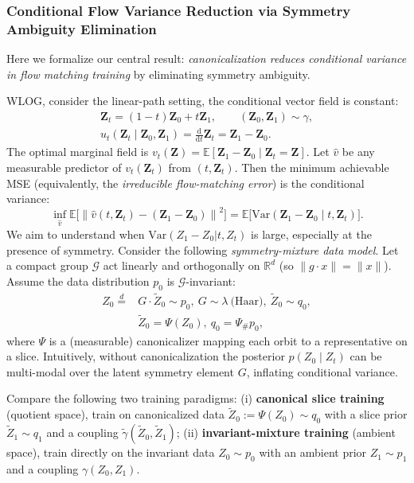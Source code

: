 \documentclass{article}
\theoremstyle{plain}
\theoremstyle{definition}
\theoremstyle{remark}
\newcommand{\E}{\mathbb{E}}
\newcommand{\1}{\mathbf{1}}
\newcommand{\Z}{\mathbf{Z}}
\newcommand{\norm}[1]{\left\lVert #1\right\rVert}
\begin{document}
\subsubsection{Conditional Flow Variance Reduction via Symmetry Ambiguity Elimination}\label{subsubsec:variance}
Here we formalize our central result: \emph{canonicalization reduces conditional variance in flow matching training} by eliminating symmetry ambiguity.

WLOG, consider the linear-path setting, the conditional vector field is constant:
\begin{equation}
\begin{aligned}
\Z_t = (1-t)\Z_0 + t\Z_1,\qquad (\Z_0,\Z_1)\sim \gamma,\\
u_t(\Z_t\mid \Z_0,\Z_1)=\frac{\mathrm{d}}{\mathrm{d}t}\Z_t = \Z_1-\Z_0.
\end{aligned}
\end{equation}
The optimal marginal field is $v_t(\Z)=\E[\Z_1-\Z_0\mid \Z_t=\Z]$.
Let $\hat v$ be any measurable predictor of $v_t(\Z_t)$ from $(t,\Z_t)$. Then the minimum achievable MSE (equivalently, the \emph{irreducible flow-matching error}) is the conditional variance:
\begin{equation*}
\inf_{\hat v}\E\big[\norm{\hat v(t,\Z_t)-(\Z_1-\Z_0)}^2\big]
=\E\big[\mathrm{Var}(\Z_1-\Z_0\mid t,\Z_t)\big].
\end{equation*}
We aim to understand when $\mathrm{Var}(Z_1-Z_0|t,Z_t)$ is large, especially at the presence of symmetry.
Consider the following \emph{symmetry-mixture data model}.
Let a compact group $\mathcal{G}$ act linearly and orthogonally on $\mathbb{R}^d$ (so $\|g\cdot x\|=\|x\|$). Assume the data distribution $p_0$ is $\mathcal{G}$-invariant:
\begin{equation}
\begin{aligned}
Z_0 \stackrel{d}{=} &G \cdot \widetilde Z_0\sim p_0,\ G\sim \lambda\ \text{(Haar)},\ \widetilde Z_0\sim q_0,
\\ &\widetilde Z_0 = \Psi(Z_0),\ q_0 = \Psi_{\#}p_0,
\end{aligned}
\end{equation}
where $\Psi$ is a (measurable) canonicalizer mapping each orbit to a representative on a slice. Intuitively, without canonicalization the posterior $p(Z_0\mid Z_t)$ can be multi-modal over the latent symmetry element $G$, inflating conditional variance. 

Compare the following two training paradigms:
(i) \textbf{canonical slice training} (quotient space),
train on canonicalized data $\widetilde Z_0:=\Psi(Z_0)\sim q_0$ with a slice prior $\widetilde Z_1\sim q_1$ and a coupling $\widetilde\gamma(\widetilde Z_0,\widetilde Z_1)$;
(ii) \textbf{invariant-mixture training} (ambient space),
train directly on the invariant data $Z_0\sim p_0$ with an ambient prior $Z_1\sim p_1$ and a coupling $\gamma(Z_0, Z_1)$.
\end{document}
